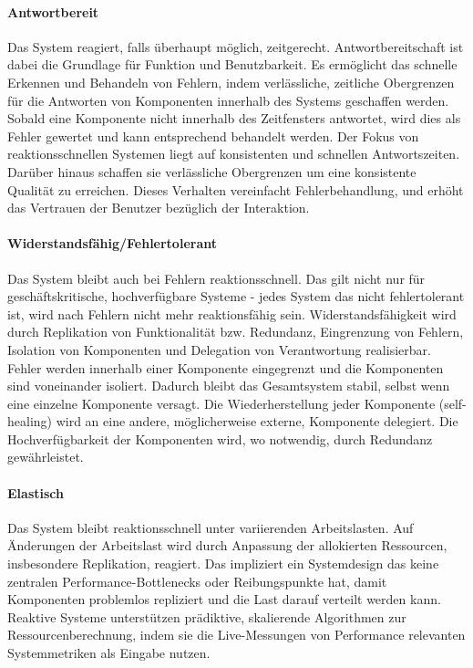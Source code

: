 \paragraph{Antwortbereit}Das System reagiert, falls überhaupt möglich, zeitgerecht. Antwortbereitschaft ist dabei die Grundlage für Funktion und
Benutzbarkeit. Es ermöglicht das schnelle Erkennen und Behandeln von Fehlern, indem verlässliche, zeitliche Obergrenzen für die Antworten von
Komponenten innerhalb des Systems geschaffen werden. Sobald eine Komponente nicht innerhalb des Zeitfensters antwortet, wird dies als Fehler gewertet und kann
entsprechend behandelt werden.
Der Fokus von reaktionsschnellen Systemen liegt auf konsistenten und schnellen Antwortszeiten. Darüber hinaus schaffen sie
verlässliche Obergrenzen um eine konsistente Qualität zu erreichen.
Dieses Verhalten vereinfacht Fehlerbehandlung, und erhöht das Vertrauen der Benutzer bezüglich der Interaktion.

\paragraph{Widerstandsfähig/Fehlertolerant}Das System bleibt auch bei Fehlern reaktionsschnell. Das gilt nicht nur für geschäftskritische, hochverfügbare Systeme -
jedes System das nicht fehlertolerant ist, wird nach Fehlern nicht mehr reaktionsfähig sein.
Widerstandsfähigkeit wird durch Replikation von Funktionalität bzw. Redundanz, Eingrenzung von Fehlern, Isolation von Komponenten und
Delegation von Verantwortung realisierbar.
Fehler werden innerhalb einer Komponente eingegrenzt und die Komponenten sind voneinander isoliert. Dadurch bleibt das Gesamtsystem stabil, selbst
wenn eine einzelne Komponente versagt.
Die Wiederherstellung jeder Komponente (self-healing) wird an eine andere, möglicherweise externe, Komponente delegiert.
Die Hochverfügbarkeit der Komponenten wird, wo notwendig, durch Redundanz gewährleistet.

\paragraph{Elastisch}Das System bleibt reaktionsschnell unter variierenden Arbeitslasten. Auf Änderungen der Arbeitslast wird durch
Anpassung der allokierten Ressourcen, insbesondere Replikation, reagiert. Das impliziert ein Systemdesign das keine zentralen Performance-Bottlenecks oder
Reibungspunkte hat, damit Komponenten problemlos repliziert und die Last darauf verteilt werden kann.
Reaktive Systeme unterstützen prädiktive, skalierende Algorithmen zur Ressourcenberechnung,
indem sie die Live-Messungen von Performance relevanten Systemmetriken als Eingabe nutzen.

